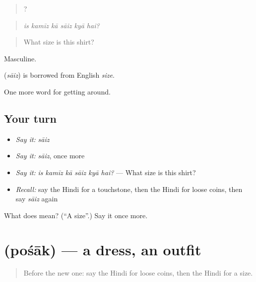 \begin{quote}
     ?
\end{quote}

\begin{quote}
\emph{is kamīz kā sāiz kyā hai?}
\end{quote}

\begin{quote}
What size is this shirt?
\end{quote}

Masculine.

\begin{cousinweb}
\textbf{} (\emph{sāiz}) is borrowed from English \emph{size}.
\end{cousinweb}

\begin{grammarlens}[title={What you've built}]
One more word for getting around.
\end{grammarlens}

\subsection*{Your turn}
\begin{itemize}
\raggedright
  \item \emph{Say it:} \emph{sāiz}
  \item \emph{Say it:} \emph{sāiz}, once more
  \item \emph{Say it:} \emph{is kamīz kā sāiz kyā hai?} — What size is this shirt?
  \item \emph{Recall:} say the Hindi for a touchstone, then the Hindi for loose coins, then say \emph{sāiz} again
\end{itemize}

\begin{tcolorbox}[breakable,colback=teal!4,colframe=teal!35!black,title={Before you move on}]
What does  mean? (\textquotedblleft{}A size\textquotedblright{}.) Say it once more.
\end{tcolorbox}
\section[\texorpdfstring{\hi{पोशाक} (pośāk)}{पोशाक (pośāk)}]{ (pośāk) — a dress, an outfit}

\label{lesson:HI-C435-posak}



\begin{quote}
Before the new one: say the Hindi for loose coins, then the Hindi for a size.
\end{quote}


